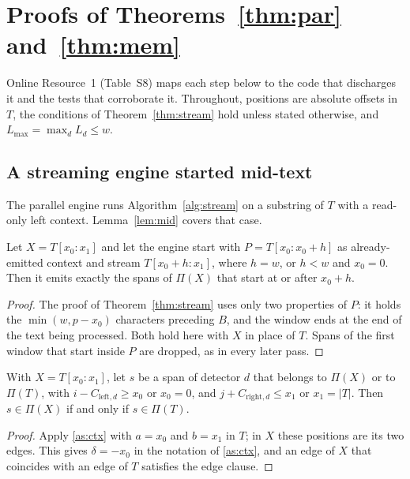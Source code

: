 \section{Proofs of Theorems~\ref{thm:par} and~\ref{thm:mem}}\label{app:proofs}

Online Resource~1 (Table~S8) maps each step below to the code that discharges it and the tests that corroborate it. Throughout, positions are absolute offsets in $T$, the conditions of Theorem~\ref{thm:stream} hold unless stated otherwise, and $L_{\max} = \max_d L_d \le w$.

\subsection{A streaming engine started mid-text}

The parallel engine runs Algorithm~\ref{alg:stream} on a substring of $T$ with a read-only left context. Lemma~\ref{lem:mid} covers that case.

\begin{lemma}\label{lem:mid}
Let $X = T[x_0{:}x_1]$ and let the engine start with $P = T[x_0{:}x_0 + h]$ as already-emitted context and stream $T[x_0 + h : x_1]$, where $h = w$, or $h < w$ and $x_0 = 0$. Then it emits exactly the spans of $\Pi(X)$ that start at or after $x_0 + h$.
\end{lemma}

\begin{proof}
The proof of Theorem~\ref{thm:stream} uses only two properties of $P$: it holds the $\min(w, p - x_0)$ characters preceding $B$, and the window ends at the end of the text being processed. Both hold here with $X$ in place of $T$. Spans of the first window that start inside $P$ are dropped, as in every later pass.
\end{proof}

\begin{lemma}\label{lem:transfer}
With $X = T[x_0{:}x_1]$, let $s$ be a span of detector $d$ that belongs to $\Pi(X)$ or to $\Pi(T)$, with $i - C_{\mathrm{left},d} \ge x_0$ or $x_0 = 0$, and $j + C_{\mathrm{right},d} \le x_1$ or $x_1 = |T|$. Then $s \in \Pi(X)$ if and only if $s \in \Pi(T)$.
\end{lemma}

\begin{proof}
Apply \ref{as:ctx} with $a = x_0$ and $b = x_1$ in $T$; in $X$ these positions are its two edges. This gives $\delta = -x_0$ in the notation of \ref{as:ctx}, and an edge of $X$ that coincides with an edge of $T$ satisfies the edge clause.
\end{proof}

